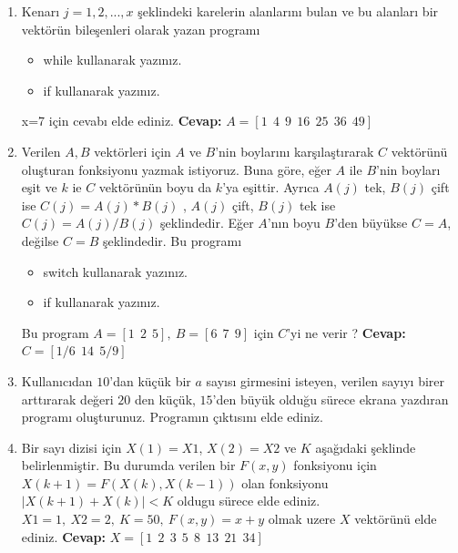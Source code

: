 \documentclass{assignment}
\begin{document}
\begin{enumerate}
\item  Kenarı \(j=1,2,...,x\) şeklindeki karelerin alanlarını bulan ve bu alanları bir vektörün bileşenleri olarak yazan programı 
\begin{itemize}
    \item while  kullanarak yazınız.
     \item if  kullanarak yazınız.
\end{itemize}
x=7 için cevabı elde ediniz. 
 \newline 
 \newline 
\textbf{Cevap:} \(A=[1 \:\: 4 \:\: 9 \:\: 16 \:\: 25 \:\: 36 \:\: 49 ]\)\\

\item  Verilen \(A,B\) vektörleri için  \(A\) ve \(B\)'nin boylarını karşılaştırarak \(C\) vektörünü oluşturan fonksiyonu  yazmak istiyoruz. 
Buna göre,  eğer \(A\) ile \(B\)'nin boyları eşit ve \(k\) ie \(C\) vektörünün boyu da \(k\)'ya eşittir. Ayrıca \(A(j)\) tek, \(B(j)\) çift ise \(C(j)=A(j)*B(j)\)
, \(A(j)\) çift, \(B(j)\) tek  ise \(C(j)=A(j)/B(j)\) şeklindedir. Eğer \(A\)'nın boyu
\(B\)'den büyükse \(C=A\), değilse \(C=B\) şeklindedir. Bu programı  
\begin{itemize}
    \item switch kullanarak yazınız.
     \item if kullanarak yazınız.
\end{itemize}
Bu program \(A=[1 \:\: 2 \:\: 5],\:B=[6 \:\: 7 \:\: 9]\)
için \(C\)'yi ne verir ? 
 \newline 
 \newline 
\textbf{Cevap:}\(C=[1/6 \:\: 14 \: \:5/9]\)

\item Kullanıcıdan \(10\)'dan küçük  bir \(a\) sayısı girmesini isteyen, verilen sayıyı birer arttırarak değeri \(20\) den küçük, \(15\)'den büyük olduğu sürece ekrana yazdıran programı oluşturunuz. Programın çıktısını elde ediniz. \\


\item Bir sayı dizisi için \(X(1)=X1\), \(X(2)=X2\) ve \(K\) aşağıdaki şeklinde belirlenmiştir. Bu
durumda verilen bir \(F(x,y)\) fonksiyonu için \(X(k+1)=F(X(k),X(k-1))\) olan
fonksiyonu \(|X(k+1)+X(k)|<K\) oldugu sürece elde ediniz. 
\(X1=1,\:X2=2,\:K=50,\: F(x,y)=x+y\) olmak
uzere \(X\) vektörünü elde ediniz. 
 \newline 
 \newline 
\textbf{Cevap:} \(X=[1 \:\: 2 \:\: 3 \:\: 5 \:\: 8 \:\: 13 \:\:21 \:\:34]\) \\


\end{enumerate}
\end{document}
